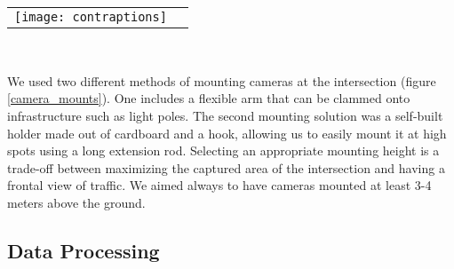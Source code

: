 \ \\





\ \\ 
\raggedbottom
\begin{tabular}{@{}cc}
\texttt{[image: contraptions]}
\end{tabular}
\label{camera_mounts}
\

We used two different methods of mounting cameras at the intersection (figure \ref{camera_mounts}). One includes a flexible arm that can be clammed onto infrastructure such as light poles.
The second mounting solution was a self-built holder made out of cardboard and a hook, allowing us to easily mount it at high spots using a long extension rod.
Selecting an appropriate mounting height is a trade-off between maximizing the captured area of the intersection and having a frontal view of traffic.
We aimed always to have cameras mounted at least 3-4 meters above the ground.

\subsection{Data Processing}
\ \\ 

